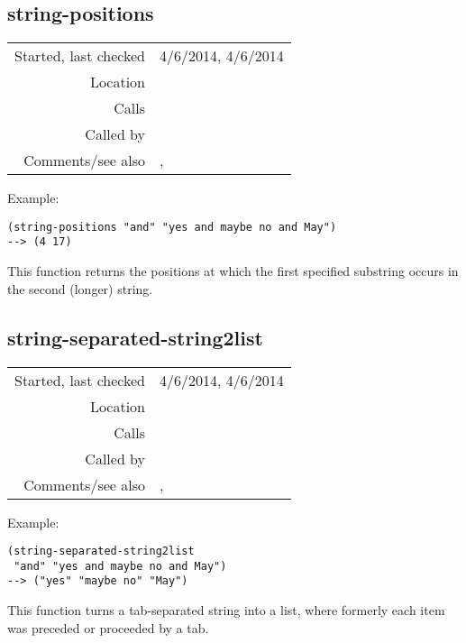 \subsection*{string-positions}\label{fun:string-positions}

\vspace{0.3cm}
\begin{tabular}{r|p{8cm}}
Started, last checked & 4/6/2014, 4/6/2014 \\
Location & \nameref{sec:csv-files} \\
Calls & \\
Called by & \nameref{fun:string-separated-string2list} \\
Comments/see also & \nameref{fun:space-bar-positions}, \nameref{fun:tab-positions}
\end{tabular}

\vspace{0.5cm}
\noindent Example:
\begin{verbatim}
(string-positions "and" "yes and maybe no and May")
--> (4 17)
\end{verbatim}

\noindent This function returns the positions at
which the first specified substring occurs in the
second (longer) string.


\subsection*{string-separated-string2list}\label{fun:string-separated-string2list}

\vspace{0.3cm}
\begin{tabular}{r|p{8cm}}
Started, last checked & 4/6/2014, 4/6/2014 \\
Location & \nameref{sec:csv-files} \\
Calls & \nameref{fun:string-positions} \\
Called by & \nameref{fun:followed-by-splitter} \\
Comments/see also & \nameref{fun:space-separated-string2list}, \nameref{fun:tab-separated-string2list}
\end{tabular}

\vspace{0.5cm}
\noindent Example:
\begin{verbatim}
(string-separated-string2list
 "and" "yes and maybe no and May")
--> ("yes" "maybe no" "May")
\end{verbatim}

\noindent This function turns a tab-separated
string into a list, where formerly each item was
preceded or proceeded by a tab.


